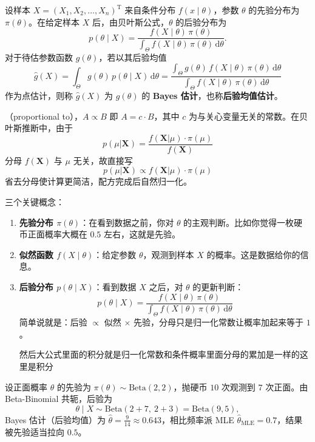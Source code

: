 \begin{definition}[Bayes 估计]
设样本 $X = (X_1, X_2, \ldots, X_n)^\mathrm{T}$ 来自条件分布 $f(x \mid \theta)$，参数 $\theta$ 的先验分布为 $\pi(\theta)$。在给定样本 $X$ 后，由贝叶斯公式，$\theta$ 的后验分布为
\[
  p(\theta \mid X) = \frac{f(X \mid \theta)\,\pi(\theta)}{\displaystyle\int_{\Theta} f(X \mid \theta)\,\pi(\theta)\,\mathrm{d}\theta}.
\]
对于待估参数函数 $g(\theta)$，若以其后验均值
\[
  \hat{g}(X) = \int_{\Theta} g(\theta)\,p(\theta \mid X)\,\mathrm{d}\theta
             = \frac{\displaystyle\int_{\Theta} g(\theta)\,f(X \mid \theta)\,\pi(\theta)\,\mathrm{d}\theta}
                    {\displaystyle\int_{\Theta} f(X \mid \theta)\,\pi(\theta)\,\mathrm{d}\theta}
\]
作为点估计，则称 $\hat{g}(X)$ 为 $g(\theta)$ 的 \textbf{Bayes 估计}，也称\textbf{后验均值估计}。
\end{definition}
\begin{dxtips}
    

（proportional to），$A \propto B$ 即 $A = c \cdot B$，其中 $c$ 为与关心变量无关的常数。在贝叶斯推断中，由于
\[
p(\mu|\boldsymbol{X}) = \frac{f(\boldsymbol{X}|\mu)\cdot\pi(\mu)}{f(\boldsymbol{X})}
\]
分母 $f(\boldsymbol{X})$ 与 $\mu$ 无关，故直接写
\[
p(\mu|\boldsymbol{X}) \propto f(\boldsymbol{X}|\mu)\cdot\pi(\mu)
\]
省去分母使计算更简洁，配方完成后自然归一化。
\end{dxtips}
\begin{note}
三个关键概念：
\begin{enumerate}
  \item \textbf{先验分布 $\pi(\theta)$}：在看到数据之前，你对 $\theta$ 的主观判断。比如你觉得一枚硬币正面概率大概在 $0.5$ 左右，这就是先验。
  \item \textbf{似然函数 $f(X\mid\theta)$}：给定参数 $\theta$，观测到样本 $X$ 的概率。这是数据给你的信息。
  \item \textbf{后验分布 $p(\theta\mid X)$}：看到数据 $X$ 之后，对 $\theta$ 的更新判断：
\[
  p(\theta \mid X) = \frac{f(X \mid \theta)\,\pi(\theta)}{\displaystyle\int_{\Theta} f(X \mid \theta)\,\pi(\theta)\,\mathrm{d}\theta}
\]
简单说就是：后验 $\propto$ 似然 $\times$ 先验，分母只是归一化常数让概率加起来等于 $1$。
\begin{dxtips}
    然后大公式里面的积分就是归一化常数和条件概率里面分母的累加是一样的这里是积分
\end{dxtips}
\end{enumerate}
\end{note}

\begin{example}
设正面概率 $\theta$ 的先验为 $\pi(\theta) \sim \text{Beta}(2,2)$，抛硬币 $10$ 次观测到 $7$ 次正面。由 Beta-Binomial 共轭，后验为
\[
  \theta \mid X \sim \text{Beta}(2+7,\ 2+3) = \text{Beta}(9,5),
\]
Bayes 估计（后验均值）为 $\hat{\theta} = \frac{9}{14} \approx 0.643$，相比频率派 MLE $\hat{\theta}_{\text{MLE}} = 0.7$，结果被先验适当拉向 $0.5$。
\end{example}
